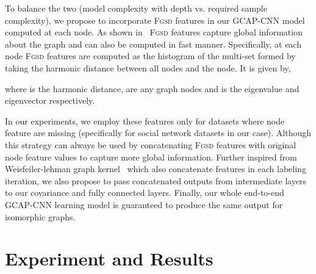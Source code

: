 \documentclass{article}
\begin{document}
To balance the two (model complexity with depth vs. required sample complexity), we propose to incorporate \textsc{Fgsd} features in our GCAP-CNN model   computed  at each node. As shown in~\cite{verma2017hunt} \textsc{Fgsd} features capture global information about the graph and can also be computed in fast manner. Specifically, at each   node   \textsc{Fgsd} features are computed  as the histogram of the multi-set formed by taking the harmonic distance between all   nodes and the  node. It is given by, 


where  is the harmonic distance,   are any graph nodes and   is the  eigenvalue and eigenvector respectively. 

In our experiments, we employ   these features only for datasets  where node feature are missing (specifically for social network datasets in our case). Although this strategy can   always be used by concatenating  \textsc{Fgsd} features with original node feature values to capture more global information. Further  inspired from Weisfeiler-lehman graph kernel~\cite{shervashidze2011weisfeiler} which also concatenate features in each labeling iteration, we also propose to pass concatenated   outputs from intermediate layers to our covariance   and  fully connected layers. Finally, our whole end-to-end GCAP-CNN learning model     is guaranteed   to produce the same output  for isomorphic graphs. 
       




 
\section{Experiment and Results}\label{sec:exp_results}
\end{document}
